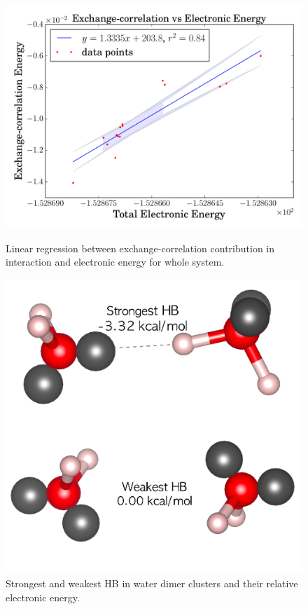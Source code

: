 \begin{figure}[h]
    \begin{minipage}[t]{0.50\textwidth}
      \centering
      \includegraphics[width=\textwidth]{4/plots/promelf/wfn_xc}
      \caption{Linear regression between exchange-correlation contribution in interaction
      and electronic energy for whole system.}
      \label{dimer_b_w_rl}
    \end{minipage}%
    \hfill
    \begin{minipage}[t]{0.4\textwidth}
      \centering
      \includegraphics[width=\textwidth]{4/plots/dibujitos/dimers_b_w}
      \caption{Strongest and weakest HB in water dimer clusters and their relative electronic energy.}
      \label{dimer_b_w_t}
    \end{minipage}%
\end{figure}

